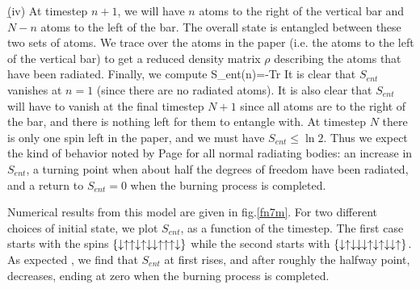 \documentclass[12pt]{article}
\begin{document}
\b

(iv) At timestep $n+1$, we will have $n$ atoms to the right of the vertical bar and $N-n$ atoms to the left of the bar. The overall state is entangled between these two sets of atoms. We trace over the atoms in the paper (i.e. the atoms to the left of the vertical bar) to get a reduced density matrix $\rho$ describing the atoms that have been radiated. Finally, we compute
\be
S_{ent}(n)=-Tr \rho\ln \rho
\ee
It is clear that $S_{ent}$ vanishes at $n=1$ (since there are no radiated atoms). It is also clear that $S_{ent}$ will have to vanish at the final timestep $N+1$ since all atoms are to the right of the bar, and there is nothing left for them to entangle with. At timestep $N$ there is only one spin left in the paper, and we must have $S_{ent}\le \ln 2$. Thus we expect the kind of behavior noted by Page \cite{page} for all normal radiating bodies: an increase in $S_{ent}$, a turning point when about half the degrees of freedom have been radiated, and a return to $S_{ent}=0$ when the burning process is completed. 

Numerical results from this model are given in fig.\ref{fn7m}. For two different choices of initial state, we plot $S_{ent}$, as a function of the timestep. The first case starts with the spins $\{\downarrow\uparrow\uparrow\downarrow\uparrow\downarrow\downarrow\uparrow\uparrow\uparrow\downarrow\}$ while the second starts with 
$\{\downarrow\uparrow\downarrow\downarrow\downarrow\uparrow\downarrow\uparrow\downarrow\downarrow\uparrow \} $. As expected \cite{page}, we find that $S_{ent}$ at first rises, and after roughly the halfway point, decreases, ending at zero when the burning process is completed. 
\end{document}
